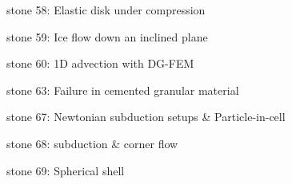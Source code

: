 {\noindent stone 58: Elastic disk under compression


\noindent stone 59: Ice flow down an inclined plane 


\noindent stone 60: 1D advection with DG-FEM 


\noindent stone 63: Failure in cemented granular material


\noindent stone 67: Newtonian subduction setups \& Particle-in-cell


\noindent stone 68: subduction \& corner flow


\noindent stone 69: Spherical shell 


}









